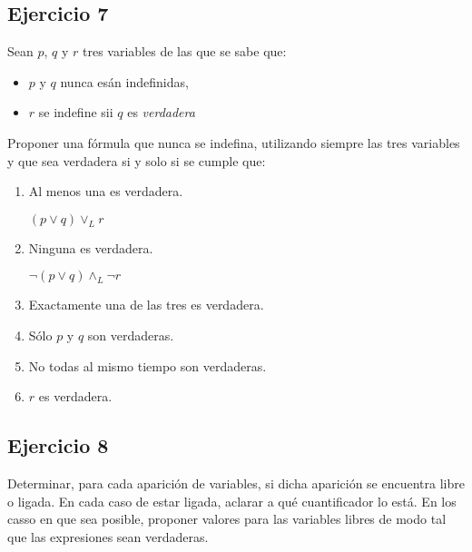 \subsection{Ejercicio 7}
Sean $p$, $q$ y $r$ tres variables de las que se sabe que:

\begin{itemize}
    \item $p$ y $q$ nunca esán indefinidas,
    \item $r$ se indefine sii $q$ es \textit{verdadera}
\end{itemize}

Proponer una fórmula que nunca se indefina, utilizando siempre las tres variables y que sea verdadera si y solo si se cumple que:

\begin{enumerate}[label=\alph*)]
    \item Al menos una es verdadera.

          $(p \lor q) \lor_L r$

    \item Ninguna es verdadera.

          $\neg (p \lor q) \land_L \neg r$

    \item Exactamente una de las tres es verdadera. \hacer

    \item Sólo $p$ y $q$ son verdaderas. \hacer

    \item No todas al mismo tiempo son verdaderas. \hacer

    \item $r$ es verdadera. \hacer
\end{enumerate}

\subsection{Ejercicio 8}
Determinar, para cada aparición de variables, si dicha aparición se encuentra libre o ligada. En cada caso de estar ligada, aclarar a qué cuantificador lo está. En los casso en que sea posible, proponer valores para las variables libres de modo tal que las expresiones sean verdaderas.

